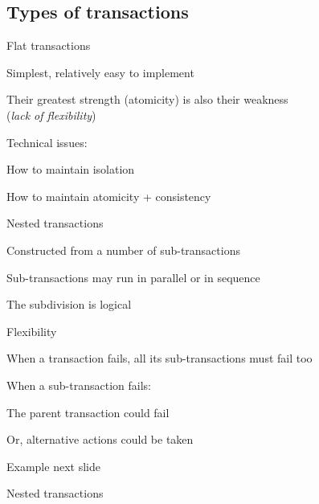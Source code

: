 \subsection{Types of transactions}

\begin{frame}{Flat transactions}
	
\BI
  \item Simplest, relatively easy to implement
  \item Their greatest strength (\alert{atomicity}) is also their weakness\\ (\emph{lack of flexibility})
\item Technical issues:
  \BI
  \item How to maintain isolation
  \item How to maintain atomicity + consistency
  \EI
\EI
\end{frame}

\begin{frame}{Nested transactions}
	
  \BI
  \item Constructed from a number of sub-transactions
  \item Sub-transactions may run in parallel or in sequence
  \item The subdivision is \alert{logical}
  \item Flexibility
  \BI
  \item When a transaction fails, all its sub-transactions must fail too
  \item When a sub-transaction fails:
	\BI
	\item The parent transaction could fail
	\item Or, alternative actions could be taken
	\EI
  \EI
\item Example next slide
\EI
\end{frame}

\begin{frame}{Nested transactions}

\begin{Procedure}
\caption{Example of nested transaction (sketch)}

\end{Procedure}
\end{frame}

